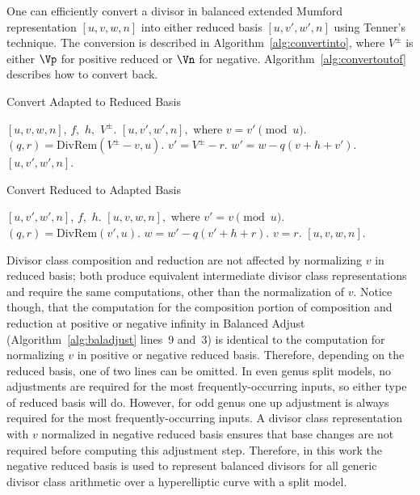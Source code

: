 One can efficiently convert a divisor in balanced extended Mumford
representation $[u,v,w,n]$ into either reduced basis $[u,v',w',n]$ using
Tenner's technique. The conversion is described in
Algorithm~\ref{alg:convertinto}, where $V^{\pm}$ is either $\Vp$ for positive
reduced or $\Vn$ for negative. Algorithm~\ref{alg:convertoutof} describes how to
convert back.
\begin{algorithm}[htbp]
    \caption{Convert Adapted to Reduced Basis}
    \label{alg:convertinto}
    \begin{algorithmic}[1]
    \Require $[u,v,w,n]$, $f,$ $h,$ $V^{\pm}$.
    \Ensure $[u,v',w',n], $ where $v = v' \pmod{u}$.
    \vspace{5pt}
    \State $(q,r) = \mathrm{DivRem}(V^{\pm} - v,u)$.
    \State $v' = V^{\pm} - r$.
    \State $w' = w - q(v + h + v')$.
    \State \Return $[u,v',w',n]$.
    \end{algorithmic}
\end{algorithm}

\begin{algorithm}[htbp]
    \caption{Convert Reduced to Adapted Basis}
    \label{alg:convertoutof}
    \begin{algorithmic}[1]
    \Require $[u,v',w',n]$, $f,$ $h.$
    \Ensure $[u,v,w,n], $ where $v' = v \pmod{u}$.
    \vspace{5pt}
    \State $(q,r) = \mathrm{DivRem}(v',u)$.
    \State $w = w' - q(v' + h + r)$.
    \State $v = r$.
    \State \Return $[u,v,w,n]$.
    \end{algorithmic}
\end{algorithm}

Divisor class composition and reduction are not affected by normalizing $v$ in
reduced basis; both produce equivalent intermediate divisor class
representations and require the same computations, other than the normalization
of $v$. Notice though, that the computation for the composition portion of
composition and reduction at positive or negative infinity in Balanced Adjust
(Algorithm~\ref{alg:baladjust} lines~9 and~3) is identical to the computation
for normalizing $v$ in positive or negative reduced basis. Therefore, depending
on the reduced basis, one of two lines can be omitted. In even genus split
models, no adjustments are required for the most frequently-occurring inputs, so
either type of reduced basis will do.  However, for odd genus one up adjustment
is always required for the most frequently-occurring inputs.  A divisor class
representation with $v$ normalized in negative reduced basis ensures that base
changes are not required before computing this adjustment step. Therefore, in
this work the negative reduced basis is used to represent balanced divisors for
all generic divisor class arithmetic over a hyperelliptic curve with a split
model.


